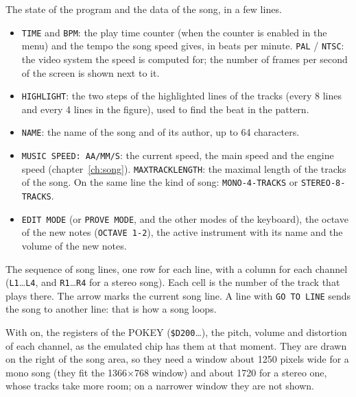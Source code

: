 \begin{description}[style=nextline,leftmargin=1.2cm]
  \item[Info area (top left)] The state of the program and the data of the song, in a few lines.
    \begin{itemize}
      \item \texttt{TIME} and \texttt{BPM}: the play time counter (when the counter is enabled in the  menu) and the
            tempo the song speed gives, in beats per minute. \texttt{PAL} / \texttt{NTSC}: the video system the speed is
            computed for; the number of frames per second of the screen is shown next to it.
      \item \texttt{HIGHLIGHT}: the two steps of the highlighted lines of the tracks (every 8 lines and every 4 lines in the
            figure), used to find the beat in the pattern.
      \item \texttt{NAME}: the name of the song and of its author, up to 64 characters.
      \item \texttt{MUSIC SPEED: AA/MM/S}: the current speed, the main speed and the engine speed (chapter~\ref{ch:song}).
            \texttt{MAXTRACKLENGTH}: the maximal length of the tracks of the song. On the same line the kind of song:
            \texttt{MONO-4-TRACKS} or \texttt{STEREO-8-TRACKS}.
      \item \texttt{EDIT MODE} (or \texttt{PROVE MODE}, and the other modes of the keyboard), the octave of the new notes
            (\texttt{OCTAVE 1-2}), the active instrument with its name and the volume of the new notes.
    \end{itemize}
  \item[Song area (top right)] The sequence of song lines, one row for each line, with a column for each channel
    (\texttt{L1}\ldots\texttt{L4}, and \texttt{R1}\ldots\texttt{R4} for a stereo song). Each cell is the number of the track
    that plays there. The arrow marks the current song line. A line with \texttt{GO TO LINE} sends the song to another line:
    that is how a song loops.
  \item[Pokey registers] With  on, the registers of the POKEY (\texttt{\$D200}\ldots), the
        pitch, volume and distortion of each channel, as the emulated chip has them at that moment. They are drawn on the right of the song area,
        so they need a window about 1250 pixels wide for a mono song (they fit the 1366$\times$768 window) and about 1720 for a stereo one, whose
        tracks take more room; on a narrower window they are not shown.

\end{description}
